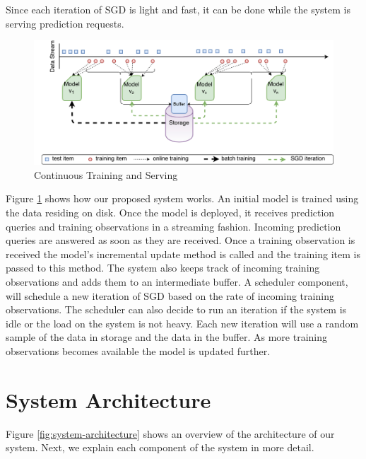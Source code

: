 \documentclass{vldb}
\begin{document}
Since each iteration of SGD is light and fast, it can be done while the system is serving prediction requests.
\begin{figure}[t]
\centering
\includegraphics[scale = 0.5]{../images/continuous-1.pdf}
\caption{Continuous Training and Serving}
\label{fig:cont-training-serving}
\end{figure}

Figure \ref{fig:cont-training-serving} shows how our proposed system works.
An initial model is trained using the data residing on disk.
Once the model is deployed, it receives prediction queries and training observations in a streaming fashion.
Incoming prediction queries are answered as soon as they are received.
Once a training observation is received the model's incremental update method is called and the training item is passed to this method.
The system also keeps track of incoming training observations and adds them to an intermediate buffer.
A scheduler component, will schedule a new iteration of SGD based on the rate of incoming training observations. 
The scheduler can also decide to run an iteration if the system is idle or the load on the system is not heavy. 
Each new iteration will use a random sample of the data in storage and the data in the buffer. 
As more training observations becomes available the model is updated further.


\section{System Architecture}
Figure \ref{fig:system-architecture} shows an overview of the architecture of our system.
Next, we explain each component of the system in more detail.
\end{document}
